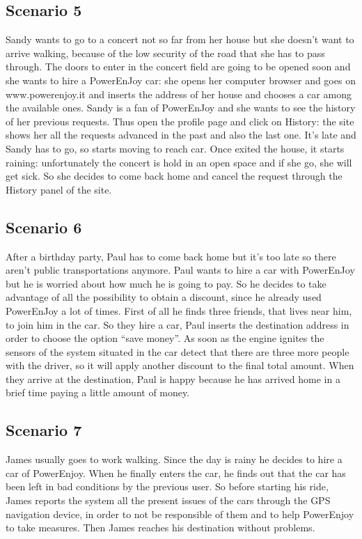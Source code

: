 \subsection{Scenario 5}
Sandy wants to go to a concert not so far from her house but she doesn’t want to arrive walking, because of the low security of the road that she has to pass through.
The doors to enter in the concert field are going to be opened soon and she wants to hire a PowerEnJoy car: she opens her computer browser and goes on www.powerenjoy.it and inserts the address of her house and chooses a car among the available ones.
Sandy is a fan of PowerEnJoy and she wants to see the history of her previous requests.
Thus open the profile page and click on History: the site shows her all the requests advanced in the past and also the last one.
It’s late and Sandy has to go, so starts moving to reach car.
Once exited the house, it starts raining: unfortunately the concert is hold in an open space and if she go, she will get sick.
So she decides to come back home and cancel the request through the History panel of the site.

\subsection{Scenario 6}
After a birthday party, Paul has to come back home but it’s too late so there aren’t public transportations anymore.
Paul wants to hire a car with PowerEnJoy but he is worried about how much he is going to pay.
So he decides to take advantage of all the possibility to obtain a discount, since he already used PowerEnJoy a lot of times.
First of all he finds three friends, that lives near him, to join him in the car.
So they hire a car, Paul inserts the destination address in order to choose the option “save money”.
As soon as the engine ignites the sensors of the system situated in the car detect that there are three more people with the driver, so it will apply another discount to the final total amount.
When they arrive at the destination, Paul is happy because he has arrived home in a brief time paying a little amount of money.

\subsection{Scenario 7}
James usually goes to work walking.
Since the day is rainy he decides to hire a car of PowerEnjoy.
When he finally enters the car, he finds out that the car has been left in bad conditions by the previous user.
So before starting his ride, James reports the system all the present issues of the cars through the GPS navigation device, in order to not be responsible of them and to help PowerEnjoy to take measures.
Then James reaches his destination without problems.
